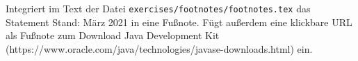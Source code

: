 Integriert im Text der Datei \texttt{exercises/footnotes/footnotes.tex} das Statement \glqq{}Stand: März 2021\grqq{} in eine Fußnote. Fügt außerdem eine klickbare URL als Fußnote zum Download Java Development Kit (https://www.oracle.com/java/technologies/javase-downloads.html) ein.

